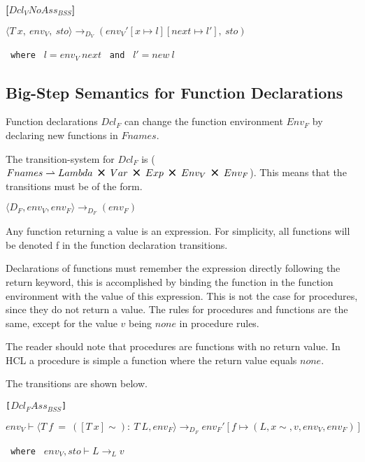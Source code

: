 \textbf{[$Dcl_VNoAss_{BSS}$]}
\begin{center}
	\begin{math}
		{\langle T\ x,\ env_V,\ sto \rangle \rightarrow_{D_V} (env_V'[x \mapsto l][next \mapsto l'],\ sto)}
	\end{math}
	
	\texttt{ where } $l = env_V\ next$
	\texttt{ and } $l' = new\ l$
\end{center}

\subsection{Big-Step Semantics for Function Declarations}
Function declarations $Dcl_F$ can change the function environment $Env_F$ by declaring new functions in $Fnames$.

The transition-system for $Dcl_F$ is ($Fnames \rightharpoonup Lambda\ \Cross\ Var\ \Cross\ Exp\ \Cross\ Env_V\ \Cross\ Env_F$).
This means that the transitions must be of the form.

\begin{center}
	$\langle D_F, env_V, env_F \rangle \rightarrow_{D_F} (env_F)$
\end{center}

Any function returning a value is an expression.
For simplicity, all functions will be denoted f in the function declaration transitions.

Declarations of functions must remember the expression directly following the return keyword, this is accomplished by binding the function in the function environment with the value of this expression.
This is not the case for procedures, since they do not return a value.
The rules for procedures and functions are the same, except for the value $v$ being $none$ in procedure rules.

The reader should note that procedures are functions with no return value.
In HCL a procedure is simple a function where the return value equals $none$.

The transitions are shown below.

\texttt{[$Dcl_FAss_{BSS}$]}
\begin{center}
	\begin{math}
			{env_V \vdash \langle T\ f\ =\ ([T\ x]\sim):\ T\ L,env_F \rangle \rightarrow_{D_F} env_F'[f \mapsto (L, x\sim, v, env_V, env_F)]}
	\end{math}
	
	\texttt{ where } $env_V, sto \vdash L \rightarrow_L v$
\end{center}

